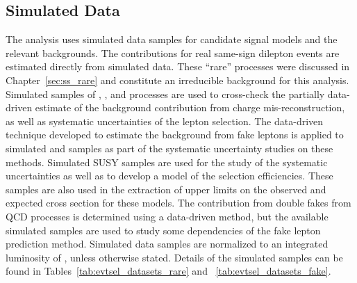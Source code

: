 \subsection{Simulated Data}
\label{sec:evtsel_samples_mc}
The analysis uses simulated data samples for candidate signal models and the
relevant backgrounds. The contributions for real same-sign dilepton events are
estimated directly from simulated data. These ``rare'' processes were discussed
in Chapter~\ref{sec:ss_rare} and constitute an irreducible background for
this analysis. Simulated samples of \Zgs, \Wj, and \ttbar processes are used to
cross-check the partially data-driven estimate of the background contribution
from charge mis-reconstruction, as well as systematic uncertainties of
the lepton selection. The data-driven technique developed to estimate the
background from fake leptons is applied to simulated \ttbar and \Wj samples
as part of the systematic uncertainty studies on these methods. Simulated SUSY
samples are used for the study of the systematic uncertainties as well as to
develop a model of the selection efficiencies. These samples are also used
in the extraction of upper limits on the observed and expected cross section
for these models. The contribution from double fakes from QCD processes is
determined using a data-driven method, but the available simulated samples
are used to study some dependencies of the fake lepton prediction method.
Simulated data samples are normalized to an integrated luminosity of \usedLumi,
unless otherwise stated. Details of the simulated samples can be found in
Tables~\ref{tab:evtsel_datasets_rare} and ~\ref{tab:evtsel_datasets_fake}.

